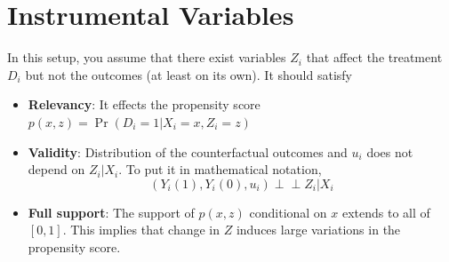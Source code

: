 \section{Instrumental Variables}
In this setup, you assume that there exist variables $Z_i$ that affect the treatment $D_i$ but not the outcomes (at least on its own). It should satisfy
\begin{itemize}
\item \textbf{Relevancy}: It effects the propensity score $p(x,z)=\Pr(D_i=1|X_i=x, Z_i=z)$
\item \textbf{Validity}: Distribution of the counterfactual outcomes and $u_i$ does not depend on $Z_i|X_i$. To put it in mathematical notation, 
\[
(Y_i(1), Y_i(0), u_i) \perp \!\!\!\perp Z_i|X_i
\]
\begin{mdframed}[backgroundcolor=yellow!5] 

\end{mdframed}
\item \textbf{Full support}: The support of $p(x,z)$ conditional on $x$ extends to all of $[0,1]$. This implies that change in $Z$ induces large variations in the propensity score. 
\end{itemize} 
